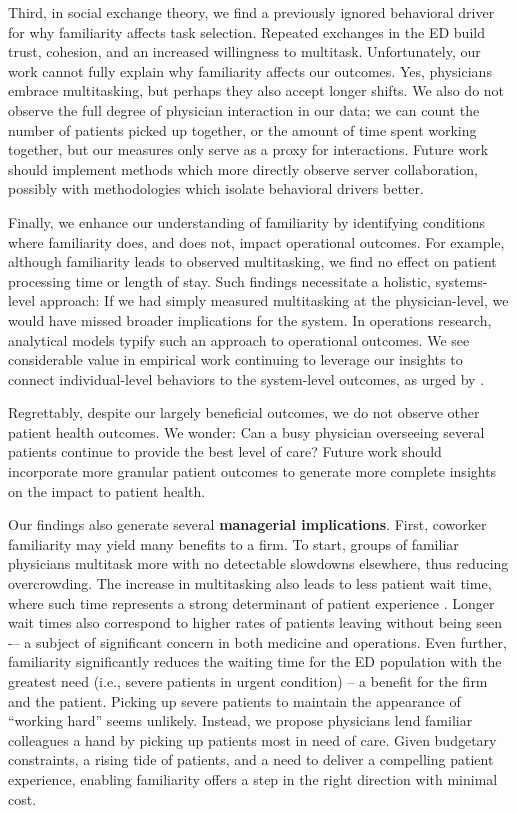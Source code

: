  Third, in social exchange theory, we find a previously ignored behavioral driver for why familiarity affects task selection. Repeated exchanges in the ED build trust, cohesion, and an increased willingness to multitask. Unfortunately, our work cannot fully explain why familiarity affects our outcomes. Yes, physicians embrace multitasking, but perhaps they also accept longer shifts. We also do not observe the full degree of physician interaction in our data; we can count the number of patients picked up together, or the amount of time spent working together, but our measures only serve as a proxy for interactions. Future work should implement methods which more directly observe server collaboration, possibly with methodologies which isolate behavioral drivers better.
 
 Finally, we enhance our understanding of familiarity by identifying conditions where familiarity does, and does not, impact operational outcomes. For example, although familiarity leads to observed multitasking, we find no effect on patient processing time or length of stay. Such findings necessitate a holistic, systems-level approach: If we had simply measured multitasking at the physician-level, we would have missed broader implications for the system. In operations research, analytical models typify such an approach to operational outcomes. We see considerable value in empirical work continuing to leverage our insights to connect individual-level behaviors to the system-level outcomes, as urged by \cite{Allon2019}.
 
 Regrettably, despite our largely beneficial outcomes, we do not observe other patient health outcomes. We wonder: Can a busy physician overseeing several patients continue to provide the best level of care? Future work should incorporate more granular patient outcomes to generate more complete insights on the impact to patient health. 

 Our findings also generate several \textbf{managerial implications}. First, coworker familiarity may yield many benefits to a firm. To start, groups of familiar physicians multitask more with no detectable slowdowns elsewhere, thus reducing overcrowding. The increase in multitasking also leads to less patient wait time, where such time represents a strong determinant of patient experience \citep{Swallmeh2018}. Longer wait times also correspond to higher rates of patients leaving without being seen \citep{Shaikh2012} -– a subject of significant concern in both medicine and operations. Even further, familiarity significantly reduces the waiting time for the ED population with the greatest need (i.e., severe patients in urgent condition) -- a benefit for the firm and the patient. Picking up severe patients to maintain the appearance of “working hard” seems unlikely. Instead, we propose physicians lend familiar colleagues a hand by picking up patients most in need of care. Given budgetary constraints, a rising tide of patients, and a need to deliver a compelling patient experience, enabling familiarity offers a step in the right direction with minimal cost.

